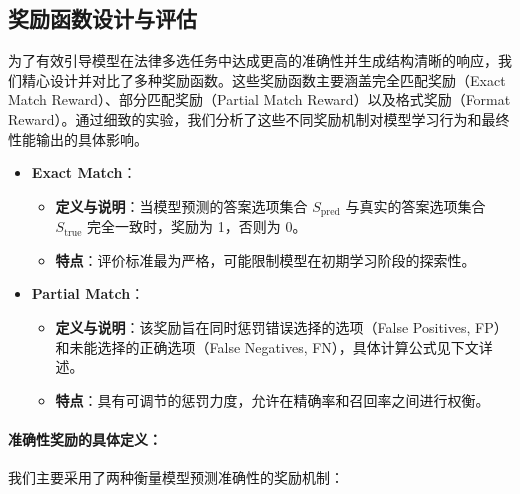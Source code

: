\documentclass{pkuthesis}
\begin{document}
\subsection{奖励函数设计与评估}
\label{sec:reward_design_experimental}





为了有效引导模型在法律多选任务中达成更高的准确性并生成结构清晰的响应，我们精心设计并对比了多种奖励函数。这些奖励函数主要涵盖完全匹配奖励（Exact Match Reward）、部分匹配奖励（Partial Match Reward）以及格式奖励（Format Reward）。通过细致的实验，我们分析了这些不同奖励机制对模型学习行为和最终性能输出的具体影响。


\begin{itemize}
    \item \textbf{Exact Match}：
    \begin{itemize}
      \item \textbf{定义与说明}：当模型预测的答案选项集合 $S_{\text{pred}}$ 与真实的答案选项集合 $S_{\text{true}}$ 完全一致时，奖励为 1，否则为 0。
      \item \textbf{特点}：评价标准最为严格，可能限制模型在初期学习阶段的探索性。
    \end{itemize}
  
    \item \textbf{Partial Match}：
    \begin{itemize}
      \item \textbf{定义与说明}：该奖励旨在同时惩罚错误选择的选项（False Positives, FP）和未能选择的正确选项（False Negatives, FN），具体计算公式见下文详述。
      \item \textbf{特点}：具有可调节的惩罚力度，允许在精确率和召回率之间进行权衡。
    \end{itemize}
  \end{itemize}
  

\paragraph{准确性奖励的具体定义：}
我们主要采用了两种衡量模型预测准确性的奖励机制：
\end{document}
